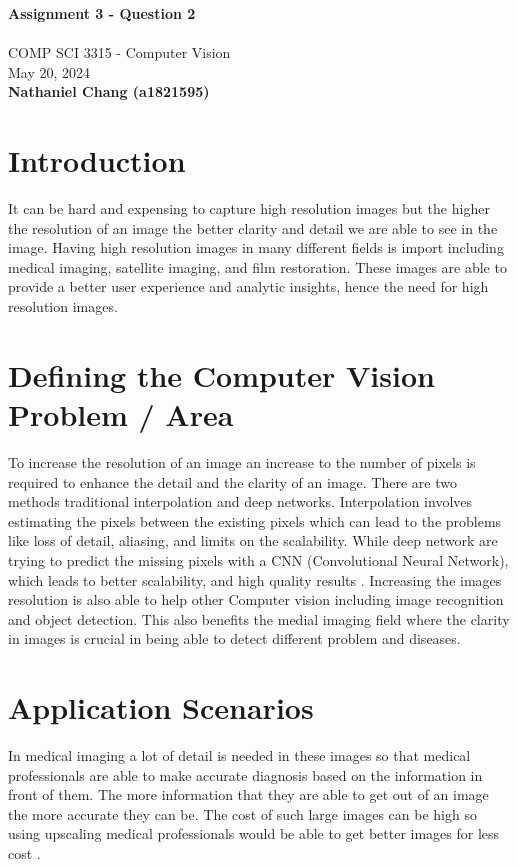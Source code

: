 \documentclass{article}
\newcommand{\hmwkName}{\textbf{\huge Assignment 3 - Question 2}}
\newcommand{\hmwkDueDate}{May 20, 2024}
\newcommand{\hmwkClass}{COMP SCI 3315 - Computer Vision}
\newcommand{\hmwkAuthorName}{\textbf{Nathaniel Chang (a1821595)}}
\renewcommand{\maketitle}{

	\hmwkName \\
	\vspace{0.01cm} \\
	\hmwkClass \\
	\hmwkDueDate \\
	\hmwkAuthorName \\
	
	\vspace{1cm}
    
}
\begin{document}
\maketitle

\section{Introduction}

It can be hard and expensing to capture high resolution images but the higher the resolution of an image the better clarity and detail we are able to see in the image. Having high resolution images in many different fields is import including medical imaging, satellite imaging, and film restoration. These images are able to provide a better user experience and analytic insights, hence the need for high resolution images.

\section{Defining the Computer Vision Problem / Area}

To increase the resolution of an image an increase to the number of pixels is required to enhance the detail and the clarity of an image. There are two methods traditional interpolation and deep networks. Interpolation involves estimating the pixels between the existing pixels which can lead to the problems like loss of detail, aliasing, and limits on the scalability. While deep network are trying to predict the missing pixels with a CNN (Convolutional Neural Network), which leads to better scalability, and high quality results \cite{medium1}. Increasing the images resolution is also able to help other Computer vision including image recognition and object detection. This also benefits the medial imaging field where the clarity in images is crucial in being able to detect different problem and diseases.


\section{Application Scenarios}

In medical imaging a lot of detail is needed in these images so that medical professionals are able to make accurate diagnosis based on the information in front of them. The more information that they are able to get out of an image the more accurate they can be. The cost of such large images can be high so using upscaling medical professionals would be able to get better images for less cost \cite{Ahmad2022}.
\end{document}
